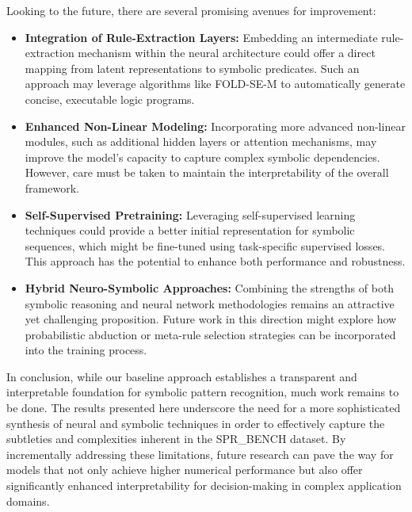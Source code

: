 \documentclass{article}
\begin{document}
Looking to the future, there are several promising avenues for improvement:
\begin{itemize}
    \item \textbf{Integration of Rule-Extraction Layers:} Embedding an intermediate rule-extraction mechanism within the neural architecture could offer a direct mapping from latent representations to symbolic predicates. Such an approach may leverage algorithms like FOLD-SE-M to automatically generate concise, executable logic programs.
    \item \textbf{Enhanced Non-Linear Modeling:} Incorporating more advanced non-linear modules, such as additional hidden layers or attention mechanisms, may improve the model’s capacity to capture complex symbolic dependencies. However, care must be taken to maintain the interpretability of the overall framework.
    \item \textbf{Self-Supervised Pretraining:} Leveraging self-supervised learning techniques could provide a better initial representation for symbolic sequences, which might be fine-tuned using task-specific supervised losses. This approach has the potential to enhance both performance and robustness.
    \item \textbf{Hybrid Neuro-Symbolic Approaches:} Combining the strengths of both symbolic reasoning and neural network methodologies remains an attractive yet challenging proposition. Future work in this direction might explore how probabilistic abduction or meta-rule selection strategies can be incorporated into the training process.
\end{itemize}

In conclusion, while our baseline approach establishes a transparent and interpretable foundation for symbolic pattern recognition, much work remains to be done. The results presented here underscore the need for a more sophisticated synthesis of neural and symbolic techniques in order to effectively capture the subtleties and complexities inherent in the SPR\_BENCH dataset. By incrementally addressing these limitations, future research can pave the way for models that not only achieve higher numerical performance but also offer significantly enhanced interpretability for decision-making in complex application domains.
\end{document}
